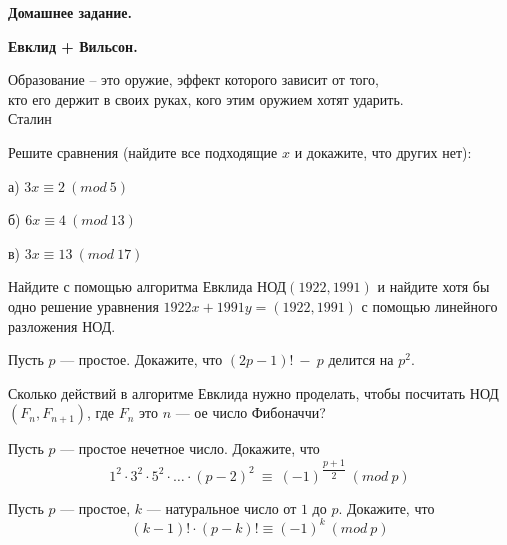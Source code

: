 \centerline{\bf \Huge Домашнее задание.}
\centerline{\bf \Huge Евклид + Вильсон.}

\begin{flushright}
        \scriptsize{Образование – это оружие, эффект которого зависит от того,\\ кто его держит в своих руках, кого этим оружием хотят ударить.\\Сталин}
\end{flushright}

Решите сравнения (найдите все подходящие $x$ и докажите, что других нет):

а) $3x \equiv 2 \ (mod \ 5)$

б) $6x \equiv 4 \ (mod \ 13 )$

в) $3x \equiv 13 \ (mod \ 17)$

Найдите с помощью алгоритма Евклида НОД$(1922, 1991)$ и найдите хотя бы одно решение уравнения $1922x + 1991y = (1922, 1991)$ с помощью линейного разложения НОД.


Пусть $p$ --- простое. Докажите, что $(2p - 1)! \ - \ p$ делится на $p^2$.

Сколько действий в алгоритме Евклида нужно проделать, чтобы посчитать НОД$(F_n, F_{n+1})$, где $F_n$ это $n$ --- ое число Фибоначчи?

Пусть $p$ --- простое нечетное число. Докажите, что 
\[ 1^2 \cdot 3^2 \cdot 5^2 \cdot \ldots \cdot (p-2)^2 \ \equiv \ \left(-1\right)^{\dfrac{p+1}{2}} \ (mod \ p)\]

Пусть $p$ --- простое, $k$ --- натуральное число от $1$ до $p$. Докажите, что
\[(k - 1)! \cdot (p - k)! \equiv (-1)^{k} \ (mod \ p)\]